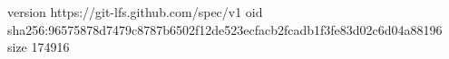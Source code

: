 version https://git-lfs.github.com/spec/v1
oid sha256:96575878d7479c8787b6502f12de523ecfacb2fcadb1f3fe83d02c6d04a88196
size 174916
